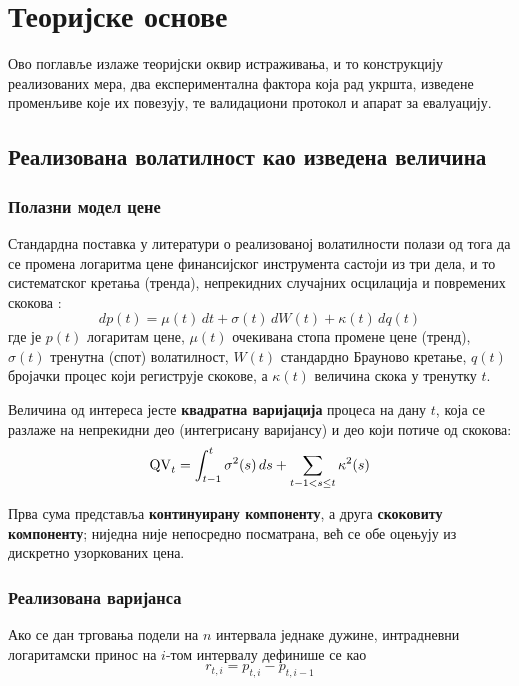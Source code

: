 \chapter{Теоријске основе}
\label{ch:teorija}

Ово поглавље излаже теоријски оквир истраживања, и то конструкцију реализованих мера, два
експериментална фактора која рад укршта, изведене променљиве које их повезују, те
валидациони протокол и апарат за евалуацију.

\section{Реализована волатилност као изведена величина}

\subsection{Полазни модел цене}

Стандардна поставка у литератури о реализованој волатилности полази од тога да се
промена логаритма цене финансијског инструмента састоји из три дела, и то систематског
кретања (тренда), непрекидних случајних осцилација и повремених скокова
\parencite{abd2007}:
\begin{equation}
dp(t) = \mu(t)\,dt + \sigma(t)\,dW(t) + \kappa(t)\,dq(t)
\label{eq:proces}
\end{equation}
где је $p(t)$ логаритам цене, $\mu(t)$ очекивана стопа промене цене (тренд),
$\sigma(t)$ тренутна (спот) волатилност, $W(t)$ стандардно Брауново кретање, $q(t)$ бројачки процес који
региструје скокове, а $\kappa(t)$ величина скока у тренутку $t$.

Величина од интереса јесте \textbf{квадратна варијација} процеса на дану $t$, која
се разлаже на непрекидни део (интегрисану варијансу) и део који потиче од скокова:
\begin{equation}
\mathrm{QV}_t = \int_{t-1}^{t}\sigma^2(s)\,ds + \sum_{t-1 < s \le t}\kappa^2(s)
\end{equation}

Прва сума представља \textbf{континуирану компоненту}, а друга \textbf{скоковиту
компоненту}; ниједна није непосредно посматрана, већ се обе оцењују из дискретно
узоркованих цена.

\subsection{Реализована варијанса}
\label{subsec:rv}

Ако се дан трговања подели на $n$ интервала једнаке дужине, интрадневни
логаритамски принос на $i$-том интервалу дефинише се као
\begin{equation}
r_{t,i} = p_{t,i} - p_{t,i-1}
\end{equation}

